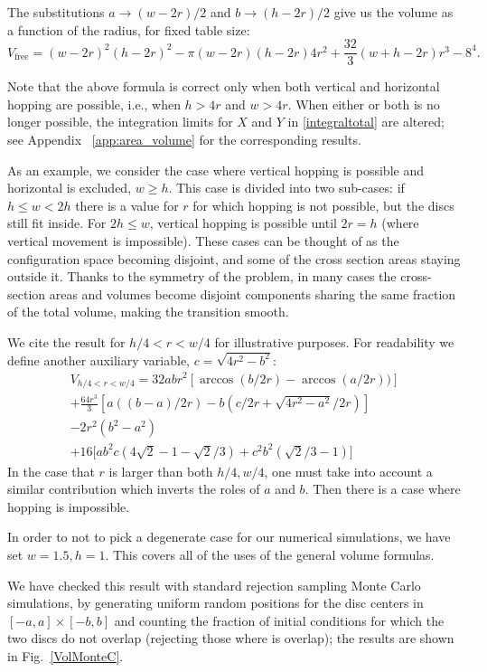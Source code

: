 \documentclass[superscriptaddress,pre,reprint,showpacs,onecolumn]{revtex4-1}
\begin{document}
The substitutions $a\rightarrow (w-2r)/2$ and $b\rightarrow (h-2r)/2$ give us
 the volume as a function of the radius, for fixed table size:
\begin{equation}\label{volumewhd}
 V_\text{free} 
= (w-2r)^{2} (h-2r)^{2}  - 
 \pi (w-2r)(h-2r) 4 r^{2} + 
\textstyle \frac{32}{3} (w+h-2r) r^{3}  
- 8^{4}.
\end{equation}

Note that the above formula is correct only when both
vertical and horizontal hopping are possible, i.e., when $h > 4r$ and $w > 4r$.
When either or both is no longer possible, the 
integration limits for $X$ and $Y$ in \eqref{integraltotal} are altered; 
see Appendix ~\ref{app:area_volume} for the corresponding results.

As an example, we consider the case where vertical hopping is possible
and horizontal is excluded,  $w \geq h$.
This case is divided into two sub-cases: if
$ h \leq  w < 2 h $ there is a value for $r$ for which hopping is not possible,
but the discs still fit inside. For $ 2 h \leq w $, vertical hopping is
possible until $ 2 r= h$ (where vertical movement is impossible). These cases
can be thought of as the configuration space becoming disjoint, and
some of the cross section areas staying outside it. Thanks to the symmetry of
the problem, in many cases the cross-section areas and 
volumes become disjoint components sharing the same fraction of
the total volume, making the transition smooth.

We cite the  result for $h/4  <r< w/4$ for illustrative purposes.
For readability we define another auxiliary variable,
$c=\sqrt{4r^2-b^2}$:
\begin{multline}\label{VolumenCasoFeo}
V_{h/4<r<w/4} = 32abr^2[\arccos(b/2r)-\arccos(a/2r))]\\
+\frac{64 r^3}{3 }[a((b-a)/2r)-b(c/2r+\sqrt{4r^2-a^2}/2r)]\\
-2r^2 (b^2-a^2)\\ 
+16[ a b^2 c (4\sqrt{2}-1-\sqrt{2}/3)
+c^2b^2 (\sqrt{2}/3-1) \big]
\end{multline}
In the case that $r$ is larger than both $h/4, w/4$, one must take
into account a similar
contribution which inverts the roles of $a$ and $b$. Then there is
a case where hopping is impossible. 

In order to not to pick a degenerate case for our numerical simulations,
we have set $w=1.5, h=1$. This covers all of the uses of the general volume formulas.


We have checked this result with standard rejection sampling Monte Carlo simulations, 
by generating uniform random positions for the disc centers in 
$[-a,a] \times [-b,b]$ and 
counting the fraction of initial conditions for 
which the two discs do not overlap (rejecting those where is overlap); the results are shown in Fig.~\ref{VolMonteC}.
\end{document}
